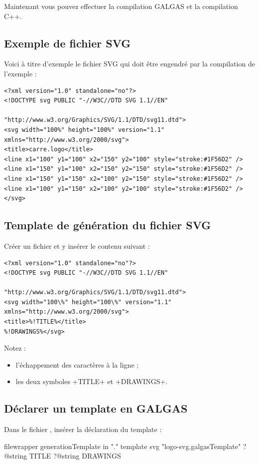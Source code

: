 Maintenant vous pouvez effectuer la compilation GALGAS et la compilation C++.

\subsection{Exemple de fichier SVG}
Voici à titre d'exemple le fichier SVG qui doit être engendré par la compilation de l'exemple  :

{\singlespacing
\begin{verbatim}
<?xml version="1.0" standalone="no"?>
<!DOCTYPE svg PUBLIC "-//W3C//DTD SVG 1.1//EN"
                              "http://www.w3.org/Graphics/SVG/1.1/DTD/svg11.dtd">
<svg width="100%" height="100%" version="1.1" xmlns="http://www.w3.org/2000/svg">
<title>carre.logo</title>
<line x1="100" y1="100" x2="150" y2="100" style="stroke:#1F56D2" />
<line x1="150" y1="100" x2="150" y2="150" style="stroke:#1F56D2" />
<line x1="150" y1="150" x2="100" y2="150" style="stroke:#1F56D2" />
<line x1="100" y1="150" x2="100" y2="100" style="stroke:#1F56D2" />
</svg>
\end{verbatim}
}

\subsection{Template de génération du fichier SVG}
Créer un fichier  et y insérer le contenu suivant :
{\singlespacing
\begin{verbatim}
<?xml version="1.0" standalone="no"?>
<!DOCTYPE svg PUBLIC "-//W3C//DTD SVG 1.1//EN"
                                "http://www.w3.org/Graphics/SVG/1.1/DTD/svg11.dtd">
<svg width="100\%" height="100\%" version="1.1" xmlns="http://www.w3.org/2000/svg">
<title>%!TITLE%</title>
%!DRAWINGS%</svg>
\end{verbatim}
}


Notez :
\begin{itemize}
  \item l'échappement des caractères \tpp{\%} à la ligne  ;
  \item les deux symboles \ggs+TITLE+ et \ggs+DRAWINGS+.
\end{itemize}

\subsection{Déclarer un template en GALGAS}
Dans le fichier , insérer la déclaration du template :
\begin{galgas}
filewrapper generationTemplate in "." {
}{
}{
  template svg "logo-svg.galgasTemplate"
    ?@string TITLE
    ?@string DRAWINGS
}
\end{galgas}

